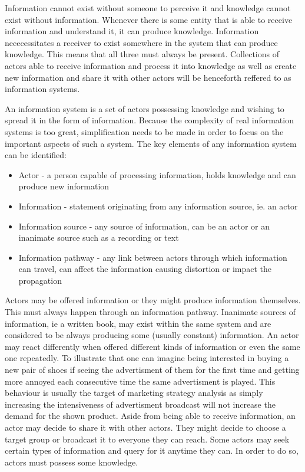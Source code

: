Information cannot exist without someone to perceive it and knowledge cannot exist without information.
Whenever there is some entity that is able to receive information and understand it, it can produce knowledge.
Information nececessitates a receiver to exist somewhere in the system that can produce knowledge.
This means that all three must always be present.
Collections of actors able to receive information and process it into knowledge as well as create new information and share it with other actors will be henceforth reffered to as information systems.

An information system is a set of actors possessing knowledge and wishing to spread it in the form of information.
Because the complexity of real information systems is too great, simplification needs to be made in order to focus on the important aspects of such a system.
The key elements of any information system can be identified:
\begin{itemize}
    \item Actor - a person capable of processing information, holds knowledge and can produce new information
    \item Information - statement originating from any information source, ie. an actor
    \item Information source - any source of information, can be an actor or an inanimate source such as a recording or text
    \item Information pathway - any link between actors through which information can travel, can affect the information causing distortion or impact the propagation
\end{itemize}
Actors may be offered information or they might produce information themselves.
This must always happen through an information pathway.
Inanimate sources of information, ie a written book, may exist within the same system and are considered to be always producing some (usually constant) information.
An actor may react differently when offered different kinds of information or even the same one repeatedly.
To illustrate that one can imagine being interested in buying a new pair of shoes if seeing the advertisment of them for the first time and getting more annoyed each consecutive time the same advertisment is played.
This behaviour is usually the target of marketing strategy analysis as simply increasing the intensiveness of advertisment broadcast will not increase the demand for the shown product.
Aside from being able to receive information, an actor may decide to share it with other actors.
They might decide to choose a target group or broadcast it to everyone they can reach.
Some actors may seek certain types of information and query for it anytime they can.
In order to do so, actors must possess some knowledge.

